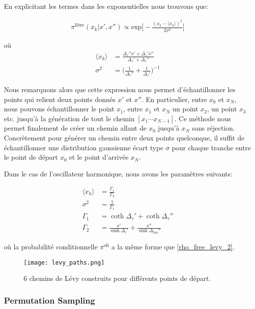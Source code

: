 \documentclass[11pt]{article}
\theoremstyle{definition}
\theoremstyle{remark}
\begin{document}
En explicitant les termes dans les exponentielles nous trouvons que: 

\begin{align} 
\label{rho_free_levy_2}
\pi^{\mathrm{libre}}(x_k|x',x'') \propto \mathrm{exp}\Big[ - \frac{(x_k - \langle x_k \rangle)^2}{2 \sigma^2} \Big]
\end{align}

où 
\begin{align} 
\langle x_k \rangle &= \frac{\Delta_{\tau}'' x' + \Delta_{\tau}'x''}{\Delta_{\tau}' + \Delta_{\tau}''} \\
\sigma^2 &= \Big(\frac{1}{\Delta_{\tau}''} + \frac{1}{\Delta_{\tau}'}\Big)^{-1}
\end{align}

Nous remarquons alors que cette expression nous permet d'échantillonner les points qui relient deux points donnés $x'$ et $x''$. En particulier, entre $x_0$ et $x_N$, nous pouvons échantillonner le point $x_1$, entre $x_1$ et $x_N$ un point $x_2$, un point $x_3$ etc. jusqu'à la génération de tout le chemin $[x_1 \cdots x_{N-1}]$. Ce méthode nous permet finalement de créer un chemin allant de $x_0$ jusqu'à $x_N$ sans réjection. Concrètement pour générer un chemin entre deux points quelconque, il suffit de échantillonner une distribution gaussienne écart type $\sigma$ pour chaque tranche entre le point de départ $x_0$ et le point d'arrivée $x_N$. 

Dans le cas de l'oscillateur harmonique, nous avons les paramètres suivants: 

\begin{align}
\label{levy_parameters_ho}
\langle x_k \rangle &= \frac{\Gamma_1}{\Gamma_2} \\
\sigma^2 &= \frac{1}{\Gamma_1} \\
\Gamma_1 &= \coth{\Delta_{\tau}'} + \coth{\Delta_{\tau}''} \\
\Gamma_2 &= \frac{x'}{\sinh{\Delta_{\tau}'}} + \frac{x''}{\sinh{\Delta_{tau}''}}
\end{align}

où la probabilité conditionnelle $\pi^{\mathrm{oh}}$ a la même forme que \eqref{rho_free_levy_2}. 

\begin{figure}[!h]
\label{levy_paths}
\centering 
\texttt{[image: levy\_paths.png]}
\caption{6 chemins de Lévy construits pour différents points de départ.}
\end{figure} 

\subsubsection{Permutation Sampling} 
\end{document}
